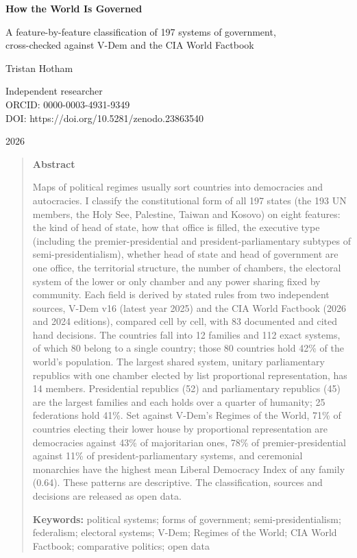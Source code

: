 \documentclass[11pt,a4paper]{article}
\begin{document}
\begin{center}
{\Large\bfseries How the World Is Governed\par}
\vspace{0.4em}
{\large A feature-by-feature classification of 197 systems of government,\\cross-checked against V-Dem and the CIA World Factbook\par}
\vspace{1.2em}
{\large Tristan Hotham\par}
\vspace{0.3em}
{\small Independent researcher\\
ORCID: 0000-0003-4931-9349\\
DOI: https://doi.org/10.5281/zenodo.23863540\par}
\vspace{0.8em}
2026
\end{center}

\begin{quote}
\small
\begin{center}\textbf{Abstract}\end{center}
Maps of political regimes usually sort countries into democracies and autocracies. I classify the constitutional form of all 197 states (the 193 UN members, the Holy See, Palestine, Taiwan and Kosovo) on eight features: the kind of head of state, how that office is filled, the executive type (including the premier-presidential and president-parliamentary subtypes of semi-presidentialism), whether head of state and head of government are one office, the territorial structure, the number of chambers, the electoral system of the lower or only chamber and any power sharing fixed by community. Each field is derived by stated rules from two independent sources, V-Dem v16 (latest year 2025) and the CIA World Factbook (2026 and 2024 editions), compared cell by cell, with 83 documented and cited hand decisions. The countries fall into 12 families and 112 exact systems, of which 80 belong to a single country; those 80 countries hold 42\% of the world's population. The largest shared system, unitary parliamentary republics with one chamber elected by list proportional representation, has 14 members. Presidential republics (52) and parliamentary republics (45) are the largest families and each holds over a quarter of humanity; 25 federations hold 41\%. Set against V-Dem's Regimes of the World, 71\% of countries electing their lower house by proportional representation are democracies against 43\% of majoritarian ones, 78\% of premier-presidential against 11\% of president-parliamentary systems, and ceremonial monarchies have the highest mean Liberal Democracy Index of any family (0.64). These patterns are descriptive. The classification, sources and decisions are released as open data.

\textbf{Keywords:} political systems; forms of government; semi-presidentialism; federalism; electoral systems; V-Dem; Regimes of the World; CIA World Factbook; comparative politics; open data
\end{quote}
\end{document}
